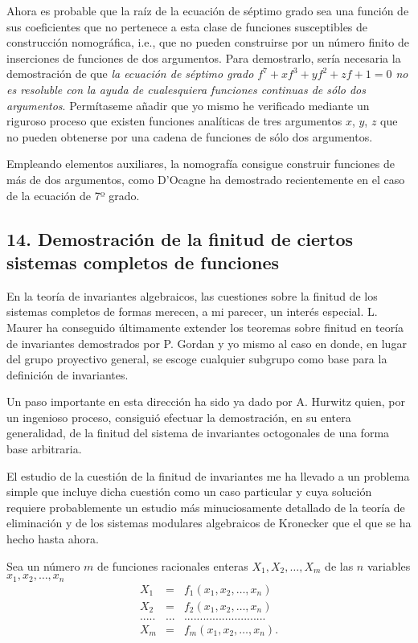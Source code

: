 \documentclass[a4paper, 12pt]{article}
\begin{document}
Ahora es probable que la raíz de la ecuación de séptimo grado sea una función de sus coeficientes que no pertenece a esta clase de funciones susceptibles de construcción nomográfica, i.e., que no pueden construirse por un número finito de inserciones de funciones de dos argumentos. Para demostrarlo, sería necesaria la demostración de que \textit{la ecuación de séptimo grado $f^7+xf^3+yf^2+zf+ 1 = 0$ no es resoluble con la ayuda de cualesquiera funciones continuas de sólo dos argumentos}. Permítaseme añadir que yo mismo he verificado mediante un riguroso proceso que existen funciones analíticas de tres argumentos $x$, $y$, $z$ que no pueden obtenerse por una cadena de funciones de sólo dos argumentos.

Empleando elementos auxiliares, la nomografía consigue construir
funciones de más de dos argumentos, como D'Ocagne ha demostrado recientemente en el caso de la ecuación de 7º grado.


\subsection*{14. Demostración de la finitud de ciertos sistemas completos
de funciones}

En la teoría de invariantes algebraicos, las cuestiones sobre la finitud de los sistemas completos de formas merecen, a mi parecer, un interés especial. L. Maurer ha conseguido últimamente extender los teoremas sobre finitud en teoría de invariantes demostrados por P. Gordan y yo mismo al caso en donde, en lugar del grupo proyectivo general, se escoge cualquier subgrupo como base para la definición de invariantes.

Un paso importante en esta dirección ha sido ya dado por A. Hurwitz quien, por un ingenioso proceso, consiguió efectuar la demostración, en su entera generalidad, de la finitud del sistema de invariantes octogonales de una forma base arbitraria.

El estudio de la cuestión de la finitud de invariantes me ha llevado a un problema simple que incluye dicha cuestión como un caso particular y cuya solución requiere probablemente un estudio más minuciosamente detallado de la teoría de eliminación y de los sistemas modulares algebraicos de Kronecker que el que se ha hecho hasta ahora.

Sea un número $m$ de funciones racionales enteras $X_1, X_2, \dots, X_m$ de las $n$ variables $x_1, x_2,\dots, x_n$
\begin{eqnarray*}\nonumber
X_1 &=&f_1(x_1, x_2, \dots, x_n) \\
 X_2 &=&f_2(x_1,x_2,\dots, x_n) \\
  .....&...&..........................\\
X_m &=&f_m(x_1, x_2, \dots, x_n).
\end{eqnarray*}
\end{document}
